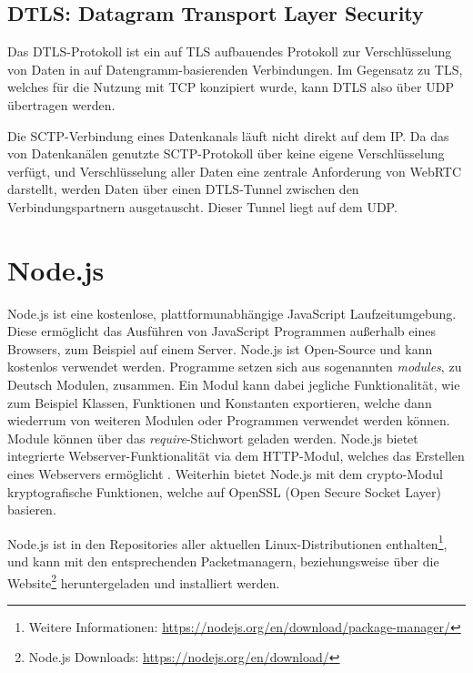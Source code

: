 \subsection{DTLS: Datagram Transport Layer Security}
Das \acf{DTLS}-Protokoll ist ein auf \acf{TLS} aufbauendes Protokoll zur Verschlüsselung von Daten in auf Datengramm-basierenden Verbindungen. Im Gegensatz zu \acs{TLS}, welches für die Nutzung mit \acs{TCP} konzipiert wurde, kann \acs{DTLS} also über \acs{UDP} übertragen werden.\par

Die \acs{SCTP}-Verbindung eines Datenkanals läuft nicht direkt auf dem \acf{IP}. Da das von Datenkanälen genutzte \acs{SCTP}-Protokoll über keine eigene Verschlüsselung verfügt, und Verschlüsselung aller Daten eine zentrale Anforderung von \acs{WebRTC} darstellt, werden Daten über einen \acs{DTLS}-Tunnel zwischen den Verbindungspartnern ausgetauscht. Dieser Tunnel liegt auf dem \acf{UDP}.

\section{Node.js}
Node.js ist eine kostenlose, plattformunabhängige JavaScript Laufzeitumgebung.
Diese ermöglicht das Ausführen von JavaScript Programmen außerhalb eines Browsers, zum Beispiel auf einem Server. Node.js ist Open-Source und kann kostenlos verwendet werden. Programme setzen sich aus sogenannten \textit{modules}, zu Deutsch Modulen, zusammen. Ein Modul kann dabei jegliche Funktionalität, wie zum Beispiel Klassen, Funktionen und Konstanten exportieren, welche dann wiederrum von weiteren Modulen oder Programmen verwendet werden können. Module können über das \textit{require}-Stichwort geladen werden. Node.js bietet integrierte Webserver-Funktionalität via dem \acs{HTTP}-Modul, welches das Erstellen eines Webservers ermöglicht \cite{nodejs}. Weiterhin bietet Node.js mit dem \glqq{}crypto\grqq{}-Modul kryptografische Funktionen, welche auf OpenSSL (Open Secure Socket Layer) basieren.\par 

Node.js ist in den Repositories aller aktuellen Linux-Distributionen enthalten\footnote{Weitere Informationen: \url{https://nodejs.org/en/download/package-manager/}}, und kann mit den entsprechenden Packetmanagern, beziehungsweise über die Website\footnote{Node.js Downloads: \url{https://nodejs.org/en/download/}} heruntergeladen und installiert werden.\par

